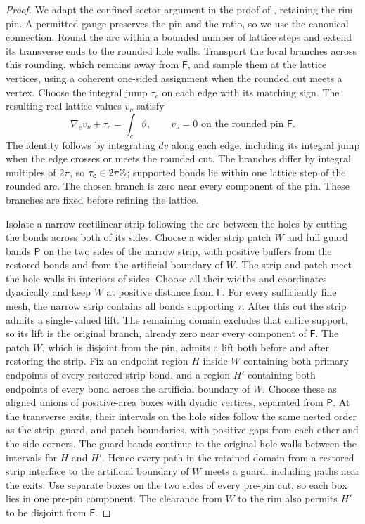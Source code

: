 \begin{proof}
We adapt the confined-sector argument in the proof of
\cite[Proposition~3.4]{S}, retaining the rim pin.  A permitted gauge
preserves the pin and the ratio, so we use the canonical connection.
Round the arc within a bounded number of lattice steps and extend its
transverse ends to the rounded hole walls.  Transport the local branches
across this rounding, which remains away from \(\mathsf F\), and sample
them at the lattice vertices,
using a coherent one-sided assignment when the rounded cut meets a
vertex.  Choose the integral jump \(\tau_e\) on each edge with its
matching sign.  The resulting real lattice values \(v_\nu\) satisfy
\[
 \nabla_e v_\nu+\tau_e=\int_e\vartheta,
 \qquad v_\nu=0\text{ on the rounded pin }\mathsf F.
\]
The identity follows by integrating \(dv\) along each edge, including
its integral jump when the edge crosses or meets the rounded cut.
The branches differ by integral multiples of \(2\pi\), so
\(\tau_e\in2\pi\mathbb Z\); supported bonds lie within one lattice step of
the rounded arc.  The chosen branch is
zero near every component of the pin.  These branches are fixed before
refining the lattice.

Isolate a narrow rectilinear strip following the arc between the holes
by cutting the bonds across both of its sides.  Choose a wider strip
patch \(W\) and full guard bands \(\mathsf P\) on the two sides of the
narrow strip, with positive buffers from the restored bonds and from
the artificial boundary of \(W\).  The strip and patch meet the hole
walls in interiors of sides.  Choose all their widths and coordinates
dyadically and keep \(W\) at positive distance from \(\mathsf F\).
For every sufficiently fine mesh, the narrow strip contains all bonds
supporting \(\tau\).  After this cut the strip admits a single-valued
lift.  The remaining domain excludes that entire support, so its lift
is the original branch, already zero near every component of
\(\mathsf F\).  The patch \(W\), which is disjoint from the pin, admits
a lift both before and after restoring the strip.
Fix an endpoint region \(H\) inside \(W\) containing both primary
endpoints of every restored strip bond, and a region \(H'\) containing
both endpoints of every bond across the artificial boundary of \(W\).
Choose these as aligned unions of positive-area boxes with dyadic vertices, separated from
\(\mathsf P\).  At the transverse exits, their intervals on the hole
sides follow the same nested order as the strip, guard, and patch
boundaries, with positive gaps from each other and the side corners.
The guard bands continue to the original hole walls between the
intervals for \(H\) and \(H'\).  Hence every path in the retained
domain from a restored strip interface to the artificial boundary
of \(W\) meets a guard, including paths near the exits.
Use separate boxes on the two sides of every pre-pin cut, so each box
lies in one pre-pin component.  The clearance from \(W\) to the rim
also permits \(H'\) to be disjoint from \(\mathsf F\).


\end{proof}
